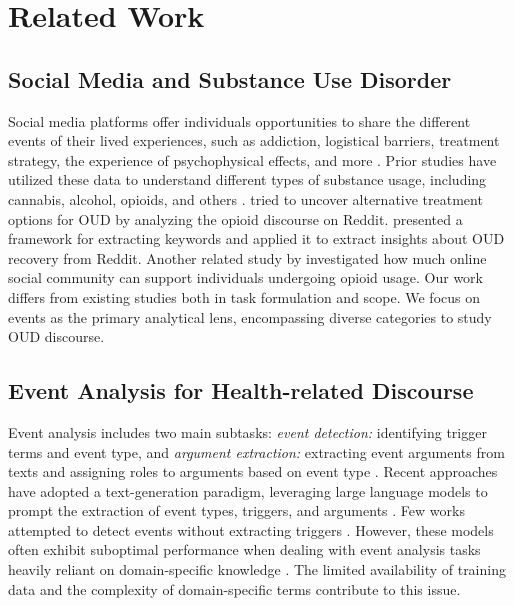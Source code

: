 \documentclass[letterpaper]{article}
\begin{document}
\section{Related Work}
\subsection{Social Media and Substance Use Disorder}
Social media platforms offer individuals opportunities to share the different events of their lived experiences, such as addiction, logistical barriers, treatment strategy, the experience of psychophysical effects, and more \cite{info:doi/10.2196/43349}. Prior studies have utilized these data to understand different types of substance usage, including cannabis, alcohol, opioids, and others \cite{Lavertu2021.04.01.21254815, CHEN2022100061}. \citeauthor{OpioidRecovery}  tried to uncover alternative treatment options for OUD by analyzing the opioid discourse on Reddit. \citeauthor{romano2023themedriven}  presented a framework for extracting keywords and applied it to extract insights about OUD recovery from Reddit. Another related study by   \citeauthor{Balsamo_Bajardi_De}  investigated how much online social community can support individuals undergoing opioid usage. Our work differs from existing studies both in task formulation and scope. We focus on events as the primary analytical lens, encompassing diverse categories to study OUD discourse.

\subsection{Event Analysis for Health-related Discourse}
Event analysis includes two main subtasks: \textit{event detection:} identifying trigger terms and event type, and \textit{argument extraction:} extracting event arguments from texts and assigning roles to arguments based on event type \cite{ma-etal-2023-dice}. %
 Recent approaches have adopted a text-generation paradigm, leveraging large language models to prompt the extraction of event types, triggers, and arguments \cite{li-etal-2021-document,lu-etal-2021-text2event}. Few works attempted to detect events without extracting triggers \cite{liu-etal-2019-event}. However, these models often exhibit suboptimal performance when dealing with event analysis tasks heavily reliant on domain-specific knowledge \cite{li2023evaluating}. The limited availability of training data and the complexity of domain-specific terms contribute to this issue.
\end{document}
